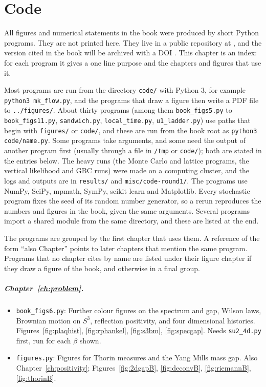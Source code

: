 \chapter{Code}\label{ch:code}

All figures and numerical statements in the book were produced by short Python programs. They are not printed here. They live in a public repository at \repourl, and the version cited in the book will be archived with a DOI \repodoi. This chapter is an index: for each program it gives a one line purpose and the chapters and figures that use it.

Most programs are run from the directory \texttt{code/} with Python 3, for example \texttt{python3 mk\_flow.py}, and the programs that draw a figure then write a PDF file to \texttt{../figures/}. About thirty programs (among them \texttt{book\_figs5.py} to \texttt{book\_figs11.py}, \texttt{sandwich.py}, \texttt{local\_time.py}, \texttt{u1\_ladder.py}) use paths that begin with \texttt{figures/} or \texttt{code/}, and these are run from the book root as \texttt{python3 code/name.py}. Some programs take arguments, and some need the output of another program first (usually through a file in \texttt{/tmp} or \texttt{code/}); both are stated in the entries below. The heavy runs (the Monte Carlo and lattice programs, the vertical likelihood and GBC runs) were made on a computing cluster, and the logs and outputs are in \texttt{results/} and \texttt{misc/code-round1/}. The programs use NumPy, SciPy, mpmath, SymPy, scikit learn and Matplotlib. Every stochastic program fixes the seed of its random number generator, so a rerun reproduces the numbers and figures in the book, given the same arguments. Several programs import a shared module from the same directory, and these are listed at the end.

The programs are grouped by the first chapter that uses them. A reference of the form ``also Chapter'' points to later chapters that mention the same program. Programs that no chapter cites by name are listed under their figure chapter if they draw a figure of the book, and otherwise in a final group.

\begingroup\small\setlength{\itemsep}{0pt}
\paragraph{Chapter~\ref{ch:problem}.}\nopagebreak
\begin{itemize}\setlength{\itemsep}{0pt}\setlength{\parskip}{0pt}
\item \texttt{book\_figs6.py}: Further colour figures on the spectrum and gap, Wilson laws, Brownian motion on $S^3$, reflection positivity, and four dimensional histories. Figures~\ref{fig:plaqhist}, \ref{fig:rphankel}, \ref{fig:s3bm}, \ref{fig:specgap}. Needs \texttt{su2\_4d.py} first, run for each $\beta$ shown.
\item \texttt{figures.py}: Figures for Thorin measures and the Yang Mills mass gap. Also Chapter~\ref{ch:positivity}; Figures~\ref{fig:2dgapB}, \ref{fig:deconvB}, \ref{fig:riemannB}, \ref{fig:thorinB}.
\end{itemize}
